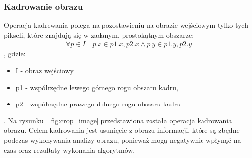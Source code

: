 \subsubsection{Kadrowanie obrazu}
Operacja kadrowania polega na pozostawieniu na obrazie wejściowym tylko tych pikseli, które znajdują się w zadanym, prostokątnym obszarze:
\begin{gather*}
  \forall p \in I\quad p.x \in {p1.x, p2.x} \wedge p.y \in {p1.y, p2.y}
\end{gather*}, gdzie:
\begin{itemize}
\item I - obraz wejściowy
\item p1 - współrzędne lewego górnego rogu obszaru kadru,
\item p2 - współrzędne prawego dolnego rogu obszaru kadru
\end{itemize}. Na rysunku ~\ref{fig:crop_image} przedstawiona została operacja kadrowania obrazu. Celem kadrowania jest usunięcie z obrazu informacji, które są zbędne podczas wykonywania analizy obrazu, ponieważ mogą negatywnie wpłynąć na czas oraz rezultaty wykonania algorytmów.
